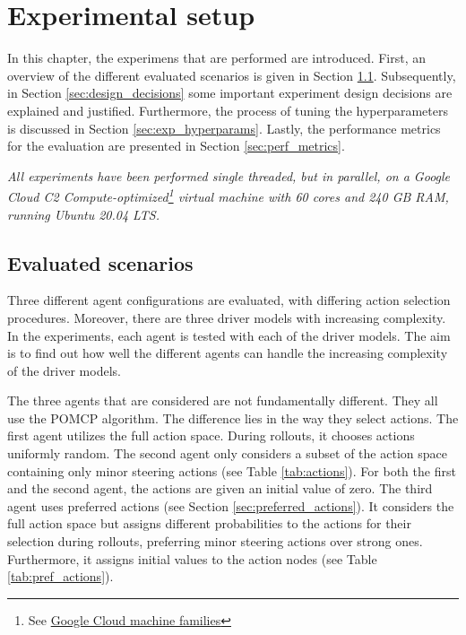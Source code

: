 \chapter{Experimental setup}
\label{ch:setup}



In this chapter, the experimens that are performed are introduced. First, an overview of the different evaluated scenarios is given in Section \ref{sec:scenarios}. Subsequently, in Section \ref{sec:design_decisions} some important experiment design decisions are explained and justified. Furthermore, the process of tuning the hyperparameters is discussed in Section \ref{sec:exp_hyperparams}. Lastly, the performance metrics for the evaluation are presented in Section \ref{sec:perf_metrics}.

\emph{All experiments have been performed single threaded, but in parallel, on a Google Cloud C2 Compute-optimized\footnote{See \href{https://cloud.google.com/compute/docs/machine-types}{Google Cloud machine families}} virtual machine with 60 cores and 240 GB RAM, running Ubuntu 20.04 LTS.}



\section{Evaluated scenarios}
\label{sec:scenarios}

Three different agent configurations are evaluated, with differing action selection procedures. Moreover, there are three driver models with increasing complexity. In the experiments, each agent is tested with each of the driver models. The aim is to find out how well the different agents can handle the increasing complexity of the driver models.

The three agents that are considered are not fundamentally different. They all use the POMCP algorithm. The difference lies in the way they select actions. The first agent utilizes the full action space. During rollouts, it chooses actions uniformly random. The second agent only considers a subset of the action space containing only minor steering actions (see Table \ref{tab:actions}). For both the first and the second agent, the actions are given an initial value of zero. The third agent uses preferred actions (see Section \ref{sec:preferred_actions}). It considers the full action space but assigns different probabilities to the actions for their selection during rollouts, preferring minor steering actions over strong ones. Furthermore, it assigns initial values to the action nodes (see Table \ref{tab:pref_actions}).

